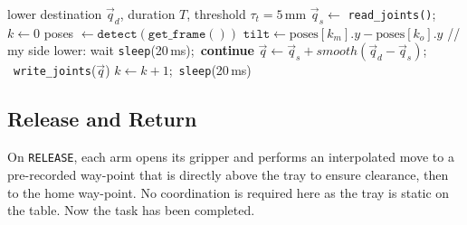 \begin{algorithm} [t]
\caption{Tilt-aware LOWER}
\label{algo:lower}
\begin{algorithmic}[1]
  \REQUIRE lower destination $\vec{q}_d$, duration $T$,
           threshold $\tau_t=5$\,mm
  \STATE $\vec{q}_s \gets$ \texttt{read\_joints()};\ \ $k \gets 0$
    \STATE poses $\gets \texttt{detect}(\texttt{get\_frame}())$
    \STATE $\texttt{tilt} \gets
            \text{poses}[k_m].y - \text{poses}[k_o].y$
      \STATE // my side lower: wait
      \STATE \texttt{sleep}(20\,ms);\ \textbf{continue}
    \ENDIF
    \STATE $\vec{q} \gets \vec{q}_s + smooth(\vec{q}_d-\vec{q}_s)$;
           \ \texttt{write\_joints}($\vec{q}$)
    \STATE $k \gets k+1$;\ \texttt{sleep}(20\,ms)
  \ENDWHILE
\end{algorithmic}
\end{algorithm}

\subsection{Release and Return}
On \texttt{RELEASE}, each arm opens its gripper and performs an interpolated move to a pre-recorded way-point that is directly above the tray to ensure clearance, then to the home way-point. No coordination is required here as the tray is static on the table. Now the task has been completed.
